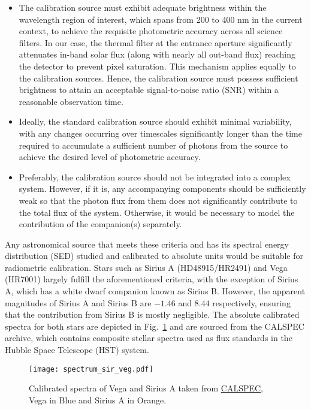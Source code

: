\begin{itemize}
    \item The calibration source must exhibit adequate brightness within the wavelength region of interest, which spans from 200 to 400 nm in the current context, to achieve the requisite photometric accuracy across all science filters. In our case, the thermal filter at the entrance aperture significantly attenuates in-band solar flux (along with nearly all out-band flux) reaching the detector to prevent pixel saturation. This mechanism applies equally to the calibration sources. Hence, the calibration source must possess sufficient brightness to attain an acceptable signal-to-noise ratio (SNR) within a reasonable observation time.
    \item Ideally, the standard calibration source should exhibit minimal variability, with any changes occurring over timescales significantly longer than the time required to accumulate a sufficient number of photons from the source to achieve the desired level of photometric accuracy.
    \item  Preferably, the calibration source should not be integrated into a complex system. However, if it is, any accompanying components should be sufficiently weak so that the photon flux from them does not significantly contribute to the total flux of the system. Otherwise, it would be necessary to model the contribution of the companion(s) separately.
\end{itemize}

Any astronomical source that meets these criteria and has its spectral energy distribution (SED) studied and calibrated to absolute units would be suitable for radiometric calibration. Stars such as Sirius A (HD48915/HR2491) and Vega (HR7001) largely fulfill the aforementioned criteria, with the exception of Sirius A, which has a white dwarf companion known as Sirius B. However, the apparent magnitudes of Sirius A and Sirius B are $-1.46$ \citep{hoffleit91} and $8.44$ \citep{mccook99,holberg13} respectively, ensuring that the contribution from Sirius B is mostly negligible. The absolute calibrated spectra for both stars are depicted in Fig.~\ref{fig:spec_1} and are sourced from the CALSPEC archive, which contains composite stellar spectra used as flux standards in the Hubble Space Telescope (HST) system.

\begin{figure}[ht!]
    \centering
    \texttt{[image: spectrum\_sir\_veg.pdf]}
    \caption{Calibrated spectra of Vega and Sirius A taken from \href{https://www.stsci.edu/hst/instrumentation/reference-data-for-calibration-and-tools/astronomical-catalogs/calspec}{CALSPEC}, Vega in Blue and Sirius A in Orange.}
    \label{fig:spec_1}
\end{figure}

